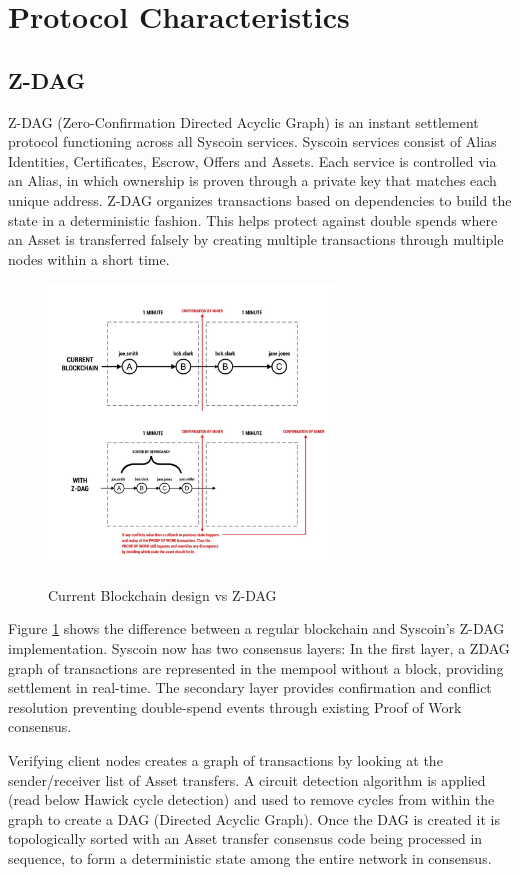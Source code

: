 \documentclass[peerreview]{ieeesyscoin}
\begin{document}
\section{Protocol Characteristics}
\label{sec:protocol}

\subsection{Z-DAG}
Z-DAG (Zero-Confirmation Directed
Acyclic Graph) is an instant settlement protocol functioning
across all Syscoin services. Syscoin services consist of
Alias Identities, Certificates, Escrow, Offers and Assets.
Each service is controlled via an Alias, in which ownership
is proven through a private key that matches each
unique address. Z-DAG organizes transactions based on
dependencies to build the state in a deterministic fashion.
This helps protect against double spends where an Asset is
transferred falsely by creating multiple transactions through
multiple nodes within a short time.

\begin{figure}[h!]
\includegraphics[width=3in]{img/current_vs_zdag.png}
\label{fig:current_vs_zdag}
\caption{Current Blockchain design vs Z-DAG} 
\end{figure} 

Figure \ref{fig:current_vs_zdag}  shows the difference between a regular
blockchain and Syscoin’s Z-DAG implementation. Syscoin
now has two consensus layers: In the first layer, a ZDAG graph of transactions are represented in the mempool
without a block, providing settlement in real-time. The secondary layer provides confirmation and conflict resolution
preventing double-spend events through existing Proof of
Work consensus.

Verifying client nodes creates a graph of transactions
by looking at the sender/receiver list of Asset transfers. A
circuit detection algorithm is applied (read below Hawick
cycle detection) and used to remove cycles from within the
graph to create a DAG (Directed Acyclic Graph). Once the
DAG is created it is topologically sorted with an Asset
transfer consensus code being processed in sequence, to
form a deterministic state among the entire network in
consensus.
\end{document}
